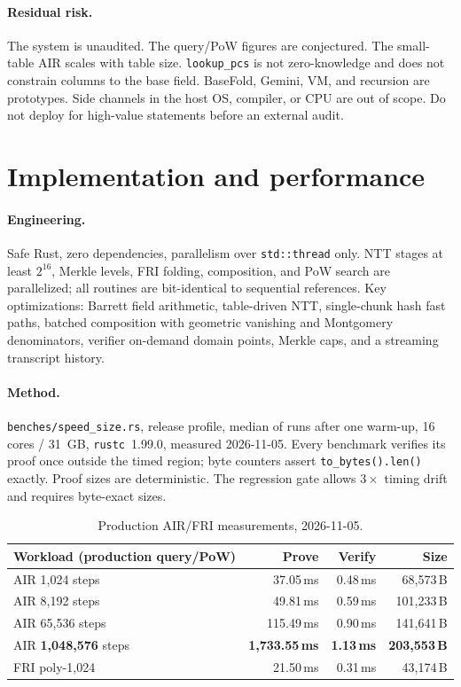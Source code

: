 \documentclass[11pt,a4paper]{article}
\begin{document}
\paragraph{Residual risk.} The system is unaudited. The query/PoW figures are
conjectured. The small-table AIR scales with table size.
\texttt{lookup\_pcs} is not zero-knowledge and does not constrain columns to
the base field. BaseFold, Gemini, VM, and recursion are prototypes. Side
channels in the host OS, compiler, or CPU are out of scope. Do not deploy for
high-value statements before an external audit.

\section{Implementation and performance}

\paragraph{Engineering.} Safe Rust, zero dependencies, parallelism over
\texttt{std::thread} only. NTT stages at least $2^{16}$, Merkle levels, FRI
folding, composition, and PoW search are parallelized; all routines are
bit-identical to sequential references. Key optimizations: Barrett field
arithmetic, table-driven NTT, single-chunk hash fast paths, batched
composition with geometric vanishing and Montgomery denominators, verifier
on-demand domain points, Merkle caps, and a streaming transcript history.

\paragraph{Method.} \texttt{benches/speed\_size.rs}, release profile, median
of runs after one warm-up, 16 cores / 31~GB, \texttt{rustc}~1.99.0, measured
2026-11-05. Every benchmark verifies its proof once outside the timed region;
byte counters assert \texttt{to\_bytes().len()} exactly. Proof sizes are
deterministic. The regression gate allows $3\times$ timing drift and requires
byte-exact sizes.

\begin{table}[h]
\centering
\small
\begin{tabular}{@{}lrrr@{}}
\toprule
Workload (production query/PoW) & Prove & Verify & Size \\
\midrule
AIR 1,024 steps & 37.05\,ms & 0.48\,ms & 68,573\,B \\
AIR 8,192 steps & 49.81\,ms & 0.59\,ms & 101,233\,B \\
AIR 65,536 steps & 115.49\,ms & 0.90\,ms & 141,641\,B \\
AIR \textbf{1,048,576} steps & \textbf{1,733.55\,ms} & \textbf{1.13\,ms} & \textbf{203,553\,B} \\
FRI poly-1,024 & 21.50\,ms & 0.31\,ms & 43,174\,B \\
\bottomrule
\end{tabular}
\caption{Production AIR/FRI measurements, 2026-11-05.}
\end{table}
\end{document}
